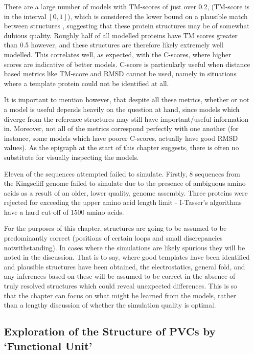 There are a large number of models with TM-scores of just over 0.2, (TM-score is in the interval $[0,1]$), which is considered the lower bound on a plausible match between structures \citep{Zhang2005}, suggesting that these protein structures may be of somewhat dubious quality. Roughly half of all modelled proteins have TM scores greater than 0.5 however, and these structures are therefore likely extremely well modelled. This correlates well, as expected, with the C-scores, where higher scores are indicative of better models. C-score is particularly useful when distance based metrics like TM-score and RMSD cannot be used, namely in situations where a template protein could not be identified at all.

It is important to mention however, that despite all these metrics, whether or not a model is useful depends heavily on the question at hand, since models which diverge from the reference structures may still have important/useful information in. Moreover, not all of the metrics correspond perfectly with one another (for instance, some models which have poorer C-scores, actually have good RMSD values). As the epigraph at the start of this chapter suggests, there is often no substitute for visually inspecting the models.

Eleven of the sequences attempted failed to simulate. Firstly, 8 sequences from the \Pasy{} Kingscliff genome failed to simulate due to the presence of ambiguous amino acids as a result of an older, lower quality, genome assembly. Three proteins were rejected for exceeding the upper amino acid length limit - I-Tasser's algorithms have a hard cut-off of 1500 amino acids. 

For the purposes of this chapter, structures are going to be assumed to be predominantly correct (positions of certain loops and small discrepancies notwithstanding). In cases where the simulations are likely spurious they will be noted in the discussion. That is to say, where good templates have been identified and plausible structures have been obtained, the electrostatics, general fold, and any inferences based on these will be assumed to be correct in the absence of truly resolved structures which could reveal unexpected differences. This is so that the chapter can focus on what might be learned from the models, rather than a lengthy discussion of whether the simulation quality is optimal.

\clearpage
\subsection{Exploration of the Structure of PVCs by `Functional Unit'}

